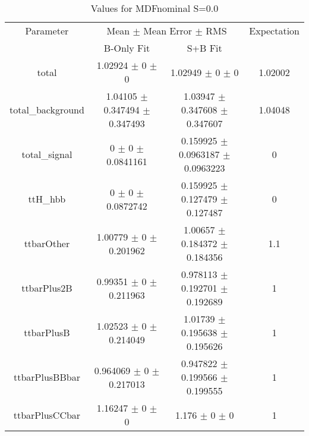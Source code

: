 \begin{table}
\centering
\caption{Values for MDFnominal S=0.0}
\begin{tabular}{cccc}
\toprule
Parameter & \multicolumn{2}{c}{Mean $\pm$ Mean Error $\pm$ RMS} & Expectation\\
 & B-Only Fit & S+B Fit & \\
\midrule
total & \num{1.02924} $\pm$ \num{0} $\pm$ \num{0} & \num{1.02949} $\pm$ \num{0} $\pm$ \num{0} & \num{1.02002}\\
total\_background & \num{1.04105} $\pm$ \num{0.347494} $\pm$ \num{0.347493} & \num{1.03947} $\pm$ \num{0.347608} $\pm$ \num{0.347607} & \num{1.04048}\\
total\_signal & \num{0} $\pm$ \num{0} $\pm$ \num{0.0841161} & \num{0.159925} $\pm$ \num{0.0963187} $\pm$ \num{0.0963223} & \num{0}\\
ttH\_hbb & \num{0} $\pm$ \num{0} $\pm$ \num{0.0872742} & \num{0.159925} $\pm$ \num{0.127479} $\pm$ \num{0.127487} & \num{0}\\
ttbarOther & \num{1.00779} $\pm$ \num{0} $\pm$ \num{0.201962} & \num{1.00657} $\pm$ \num{0.184372} $\pm$ \num{0.184356} & \num{1.1}\\
ttbarPlus2B & \num{0.99351} $\pm$ \num{0} $\pm$ \num{0.211963} & \num{0.978113} $\pm$ \num{0.192701} $\pm$ \num{0.192689} & \num{1}\\
ttbarPlusB & \num{1.02523} $\pm$ \num{0} $\pm$ \num{0.214049} & \num{1.01739} $\pm$ \num{0.195638} $\pm$ \num{0.195626} & \num{1}\\
ttbarPlusBBbar & \num{0.964069} $\pm$ \num{0} $\pm$ \num{0.217013} & \num{0.947822} $\pm$ \num{0.199566} $\pm$ \num{0.199555} & \num{1}\\
ttbarPlusCCbar & \num{1.16247} $\pm$ \num{0} $\pm$ \num{0} & \num{1.176} $\pm$ \num{0} $\pm$ \num{0} & \num{1}\\
\bottomrule
\end{tabular}
\end{table}